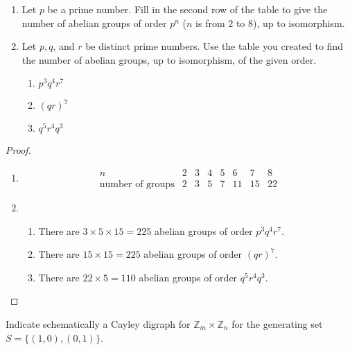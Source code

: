 \begin{exercise}
    \begin{enumerate}[label={\textbf{\alph*.}}]
        \item Let $p$ be a prime number. Fill in the second row of the table to give the number of abelian groups of order $p^{n}$ ($n$ is from $2$ to $8$), up to isomorphism.
        \item Let $p, q$, and $r$ be distinct prime numbers. Use the table you created to find the number of abelian groups, up to isomorphism, of the given order.
              \begin{enumerate}[label={\textbf{\roman*.}}]
                  \item $p^{3}q^{4}r^{7}$
                  \item ${(qr)}^{7}$
                  \item $q^{5}r^{4}q^{3}$
              \end{enumerate}
    \end{enumerate}
\end{exercise}

\begin{proof}
    \begin{enumerate}[label={\textbf{\alph*.}}]
        \item
              \[
                  \begin{array}{r|r|r|r|r|r|r|r|}
                      n                       & 2 & 3 & 4 & 5 & 6  & 7  & 8  \\
                      \hline
                      \text{number of groups} & 2 & 3 & 5 & 7 & 11 & 15 & 22
                  \end{array}
              \]
        \item
              \begin{enumerate}[label={\textbf{\roman*.}}]
                  \item There are $3\times 5\times 15 = 225$ abelian groups of order $p^{3}q^{4}r^{7}$.
                  \item There are $15\times 15 = 225$ abelian groups of order ${(qr)}^{7}$.
                  \item There are $22\times 5 = 110$ abelian groups of order $q^{5}r^{4}q^{3}$.
              \end{enumerate}
    \end{enumerate}
\end{proof}

\begin{exercise}
    Indicate schematically a Cayley digraph for $\mathbb{Z}_{m}\times \mathbb{Z}_{n}$ for the generating set $S = \{ (1,0), (0,1) \}$.
\end{exercise}

